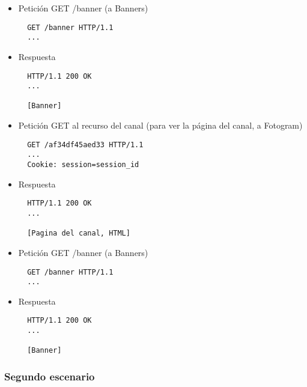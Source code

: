 \begin{itemize}
\begin{verbatim}
  [Pagina principal, ya con enlace al canal recién creado, HTML]
\end{verbatim}

La cookie que se envió anteriormente, en realidad se podría enviar aquí, pues hasta este momento no hay nada que asociar a la sesión.

\item Petición GET /banner (a Banners)

\begin{verbatim}
  GET /banner HTTP/1.1
  ...
\end{verbatim}

\item Respuesta

\begin{verbatim}
  HTTP/1.1 200 OK
  ...

  [Banner]
\end{verbatim}

\item Petición GET al recurso del canal (para ver la página del canal, a Fotogram)

\begin{verbatim}
  GET /af34df45aed33 HTTP/1.1
  ...
  Cookie: session=session_id
\end{verbatim}

\item Respuesta

\begin{verbatim}
  HTTP/1.1 200 OK
  ...

  [Pagina del canal, HTML]
\end{verbatim}

\item Petición GET /banner (a Banners)

\begin{verbatim}
  GET /banner HTTP/1.1
  ...
\end{verbatim}

\item Respuesta

\begin{verbatim}
  HTTP/1.1 200 OK
  ...

  [Banner]
\end{verbatim}

\end{itemize}

\subsubsection*{Segundo escenario}

